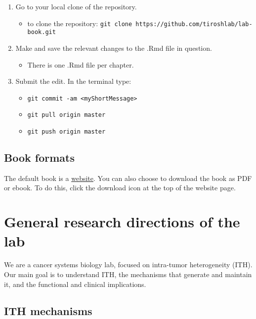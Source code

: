 \documentclass[]{book}
\providecommand{\tightlist}{%
  \setlength{\itemsep}{0pt}\setlength{\parskip}{0pt}}
\begin{document}
\begin{enumerate}
\def\labelenumi{\arabic{enumi}.}
\tightlist
\item
  Go to your local clone of the repository.

  \begin{itemize}
  \tightlist
  \item
    to clone the repository:
    \texttt{git\ clone\ https://github.com/tiroshlab/lab-book.git}\\
  \end{itemize}
\item
  Make and save the relevant changes to the .Rmd file in question.

  \begin{itemize}
  \tightlist
  \item
    There is one .Rmd file per chapter.
  \end{itemize}
\item
  Submit the edit. In the terminal type:

  \begin{itemize}
  \tightlist
  \item
    \texttt{git\ commit\ -am\ \textless{}myShortMessage\textgreater{}}
  \item
    \texttt{git\ pull\ origin\ master}
  \item
    \texttt{git\ push\ origin\ master}
  \end{itemize}
\end{enumerate}

\section{Book formats}\label{book-formats}

The default book is a
\href{https://tiroshlab.github.io/lab-book}{website}. You can also
choose to download the book as PDF or ebook. To do this, click the
download icon at the top of the website page.

\chapter{General research directions of the lab}\label{general}

We are a cancer systems biology lab, focused on intra-tumor
heterogeneity (ITH). Our main goal is to understand ITH, the mechanisms
that generate and maintain it, and the functional and clinical
implications.

\section{ITH mechanisms}\label{ith-mechanisms}
\end{document}
